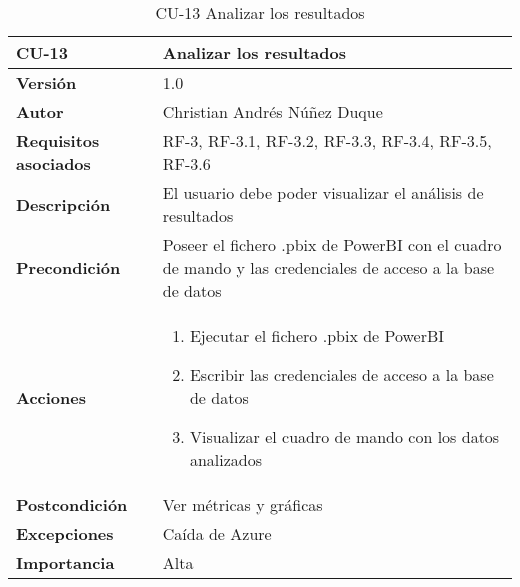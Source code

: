 \begin{table}[p]
	\centering
	\begin{tabularx}{\linewidth}{ p{} p{} }
		\toprule
		\textbf{CU-13}    & \textbf{Analizar los resultados}\\
		\toprule
		\textbf{Versión}              & 1.0    \\
		\textbf{Autor}                & Christian Andrés Núñez Duque \\
		\textbf{Requisitos asociados} & RF-3, RF-3.1, RF-3.2, RF-3.3, RF-3.4, RF-3.5, RF-3.6 \\
		\textbf{Descripción}          & El usuario debe poder visualizar el análisis de resultados \\
		\textbf{Precondición}         & Poseer el fichero .pbix de PowerBI con el cuadro de mando y las credenciales de acceso a la base de datos \\
		\textbf{Acciones}             &
		\begin{enumerate}
			\def\labelenumi{\arabic{enumi}.}
			\tightlist
			\item Ejecutar el fichero .pbix de PowerBI
			\item Escribir las credenciales de acceso a la base de datos
			\item Visualizar el cuadro de mando con los datos analizados
		\end{enumerate}\\
		\textbf{Postcondición}        & Ver métricas y gráficas \\
		\textbf{Excepciones}          & Caída de Azure \\
		\textbf{Importancia}          & Alta \\
		\bottomrule
	\end{tabularx}
	\caption{CU-13 Analizar los resultados}
\end{table}

